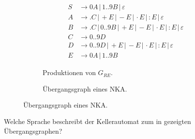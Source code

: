 \documentclass[10pt, a4paper]{scrartcl}
\begin{document}
\begin{figure}[h]
	\begin{subfigure}{.5\textwidth}
		\begin{align*}
		S &\rightarrow 0 A \,|\, 1..9 B \,|\, \varepsilon \\
		A &\rightarrow . C\,|\, +E \,|\, - E \,|\, \cdot E \,|\, : E \,|\, \varepsilon \\
		B &\rightarrow . C \,|\, 0..9 B \,|\, +E \,|\, - E \,|\, \cdot E \,|\, : E \,|\, \varepsilon \\
		C &\rightarrow 0..9 D \\
		D &\rightarrow 0..9 D \,|\, +E \,|\, - E \,|\, \cdot E \,|\, : E \,|\, \varepsilon \\
		E &\rightarrow 0 A \,|\, 1..9 B
		\end{align*}
		\caption{Produktionen von $G_{RE}$.}
		\label{abb:grammatik-rechenterme}
	\end{subfigure}%
	\begin{subfigure}{.5\textwidth}
		\begin{transitiongraph}[pa]
		\end{transitiongraph}
		\caption{Übergangsgraph eines NKA.}
		\label{abb:nka-palindrom}
	\end{subfigure}
\end{figure}

\begin{aufgabe}
\label{aufg:nka-palindrom}
Welche Sprache beschreibt der Kellerautomat zum in  gezeigten Übergangsgraphen?
\end{aufgabe}
\end{document}
